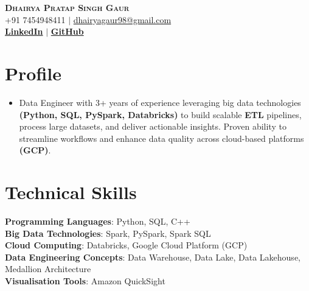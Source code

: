 \documentclass[letterpaper,11pt]{article}
\begin{document}
\begin{center}
    \textbf{\Huge \scshape Dhairya Pratap Singh Gaur} \\ \vspace{1pt}
    \small +91 7454948411 $|$ \href{mailto:dhairyagaur98@gmail.com}{{dhairyagaur98@gmail.com}}    \\ 
    \small  
    \href{https://www.linkedin.com/in/asmogaur/}{\bf LinkedIn} $|$
    \href{https://github.com/Asmogaur}{\bf GitHub} 
    
\end{center}

\section{Profile}
\begin{itemize}[leftmargin=0.15in, label={}]
\item 
Data Engineer with 3+ years of experience leveraging big data technologies \textbf{(Python, SQL, PySpark, Databricks)} to build scalable \textbf{ETL} pipelines, process large datasets, and deliver actionable insights. Proven ability to streamline workflows and enhance data quality across cloud-based platforms \textbf{(GCP)}.
\end{itemize}

\section{Technical Skills}
 \begin{itemize}[leftmargin=0.15in, label={}]
    \small{\item{
     \textbf{Programming Languages}{:\hspace{0.77cm} Python, SQL, C++} \\
     \textbf{Big Data Technologies}{:\hspace{1.20cm} Spark, PySpark, Spark SQL} \\
     \textbf{Cloud Computing}{:\hspace{1.98cm} Databricks, Google Cloud Platform (GCP)} \\
     \textbf{Data Engineering Concepts}{:\hspace{0.30cm} Data Warehouse, Data Lake, Data Lakehouse, Medallion Architecture }\\
     \textbf{Visualisation Tools}{:\hspace{1.81cm} Amazon QuickSight} \\
    }}
 \end{itemize}
\end{document}
